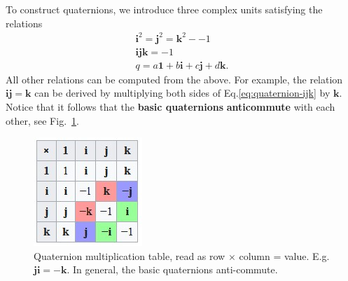 \documentclass[11pt]{article}
\numberwithin{equation}{section}
\begin{document}
To construct quaternions, we introduce three complex units satisfying the relations
\begin{align}
\mathbf{i}^2 = \mathbf{j}^2 = \mathbf{k}^2 - -1 \\
\mathbf{ijk} = -1 \\
q = a \mathbf{1} + b\mathbf{i} + c \mathbf{j} + d \mathbf{k}. \label{eq:quaternion-ijk}
\end{align}
All other relations can be computed from the above. For example, the relation $\mathbf{ij}=\mathbf{k}$ can be derived by multiplying both sides of Eq.\eqref{eq:quaternion-ijk} by $\mathbf{k}$. Notice that it follows that the \textbf{basic quaternions} \textbf{anticommute} with each other, see Fig.~\ref{fig:quaternion-multiplication}.

\begin{figure}
\begin{center}
\includegraphics[width=0.2\columnwidth]{figures/quaternion-multiplication.jpg}  
\end{center}
\caption{Quaternion multiplication table, read as row $\times$ column = value. E.g. $\mathbf{ji}=-\mathbf{k}$. In general, the basic quaternions anti-commute.}
\label{fig:quaternion-multiplication}
\end{figure}
\end{document}

